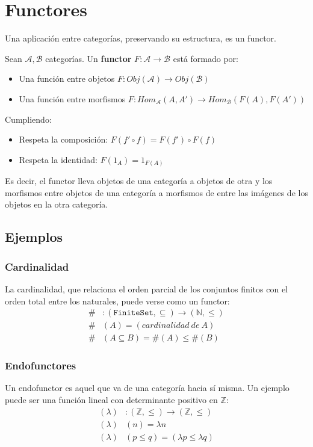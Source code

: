\documentclass[11pt, fleqn, spanish]{book}
\begin{document}
  \section {Functores}
  Una aplicación entre categorías, preservando su estructura, es un functor.
  \begin{definition} Sean $\mathcal{A}, \mathcal{B}$ categorías. Un \textbf{functor} 
  $F: \mathcal{A} \rightarrow \mathcal{B}$ está formado por:
  \begin{itemize}
   \item Una función entre objetos $F: Obj(\mathcal{A}) \rightarrow Obj(\mathcal{B})$
   \item Una función entre morfismos $F: Hom_\mathcal{A}(A,A') \rightarrow Hom_\mathcal{B}(F(A),F(A'))$
  \end{itemize}
  Cumpliendo:
  \begin{itemize}
   \item Respeta la composición: $F(f' \circ f) = F(f') \circ F(f)$
   \item Respeta la identidad: $F(1_A) = 1_{F(A)}$
  \end{itemize}
  \end{definition}

  Es decir, el functor lleva objetos de una categoría a objetos de otra y los morfismos
  entre objetos de una categoría a morfismos de entre las imágenes de los objetos en la
  otra categoría.

  \subsection {Ejemplos}
    \subsubsection{Cardinalidad}
      La cardinalidad, que relaciona el orden parcial de los conjuntos finitos con el
      orden total entre los naturales, puede verse como un functor:
      \begin{align*}
	\#&: \mathtt{(FiniteSet,\subseteq)} \rightarrow \mathtt{(\mathbb{N},\leq)} \\
	\#&(A) = (cardinalidad\ de\ A) \\
	\#&(A \subseteq B) = \#(A) \leq \#(B) 
      \end{align*}
    
    \subsubsection{Endofunctores}
      Un endofunctor es aquel que va de una categoría hacia sí misma. Un ejemplo
      puede ser una función lineal con determinante positivo en $\mathbb{Z}$:
      \begin{align*}
       (\lambda)&: \mathtt{(\mathbb{Z},\leq)} \rightarrow \mathtt{(\mathbb{Z},\leq)} \\
       (\lambda)&(n) = \lambda n \\
       (\lambda)&(p \leq q) = (\lambda p \leq \lambda q)
      \end{align*}
\end{document}
